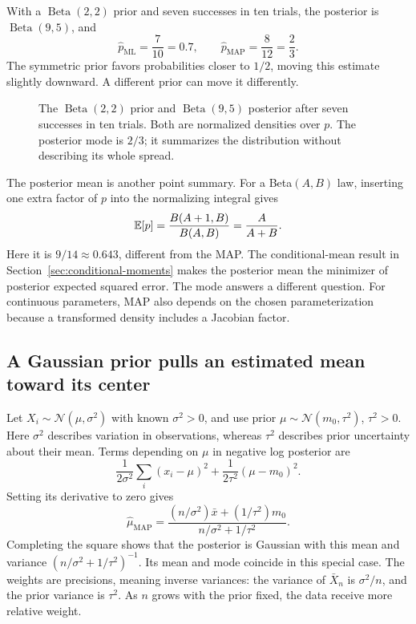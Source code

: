 With a \(\operatorname{Beta}(2,2)\) prior and seven successes in ten trials,
the posterior is \(\operatorname{Beta}(9,5)\), and
\[
  \widehat p_{\mathrm{ML}}=\frac7{10}=0.7,\qquad
  \widehat p_{\mathrm{MAP}}=\frac8{12}=\frac23.
\]
The symmetric prior favors probabilities closer to \(1/2\), moving this
estimate slightly downward. A different prior can move it differently.

\begin{figure}[H]
  \centering\EstBetaPlot
  \caption{The \(\operatorname{Beta}(2,2)\) prior and
  \(\operatorname{Beta}(9,5)\) posterior after seven successes in ten trials.
  Both are normalized densities over \(p\). The posterior mode is \(2/3\);
  it summarizes the distribution without describing its whole spread.}
  \label{fig:est-beta}
\end{figure}

The posterior mean is another point summary. For a Beta\((A,B)\) law,
inserting one extra factor of \(p\) into the normalizing integral gives
\[
  \mathbb{E}[p]=\frac{B(A+1,B)}{B(A,B)}=\frac{A}{A+B}.
\]
Here it is
\(9/14\approx0.643\), different from the MAP. The conditional-mean result
in Section~\ref{sec:conditional-moments} makes the posterior mean the
minimizer of posterior expected squared error. The mode answers a different
question. For continuous parameters, MAP also depends on the chosen
parameterization because a transformed density includes a Jacobian factor.

\subsection{A Gaussian prior pulls an estimated mean toward its center}

Let \(X_i\sim\mathcal N(\mu,\sigma^2)\) with known \(\sigma^2>0\),
and use prior \(\mu\sim\mathcal N(m_0,\tau^2)\), \(\tau^2>0\).
Here \(\sigma^2\) describes variation in observations, whereas \(\tau^2\)
describes prior uncertainty about their mean. Terms depending on \(\mu\)
in negative log posterior are
\[
  \frac1{2\sigma^2}\sum_i(x_i-\mu)^2+
  \frac1{2\tau^2}(\mu-m_0)^2.
\]
Setting its derivative to zero gives
\begin{equation}
  \widehat\mu_{\mathrm{MAP}}
  =\frac{(n/\sigma^2)\bar x+(1/\tau^2)m_0}{n/\sigma^2+1/\tau^2}.
  \label{eq:gaussian-map}
\end{equation}
Completing the square shows that the posterior is Gaussian with this mean
and variance \((n/\sigma^2+1/\tau^2)^{-1}\). Its mean and mode coincide
in this special case. The weights are precisions, meaning inverse variances:
the variance of \(\bar X_n\) is \(\sigma^2/n\), and the prior variance
is \(\tau^2\). As \(n\) grows with the prior fixed, the data receive
more relative weight.

